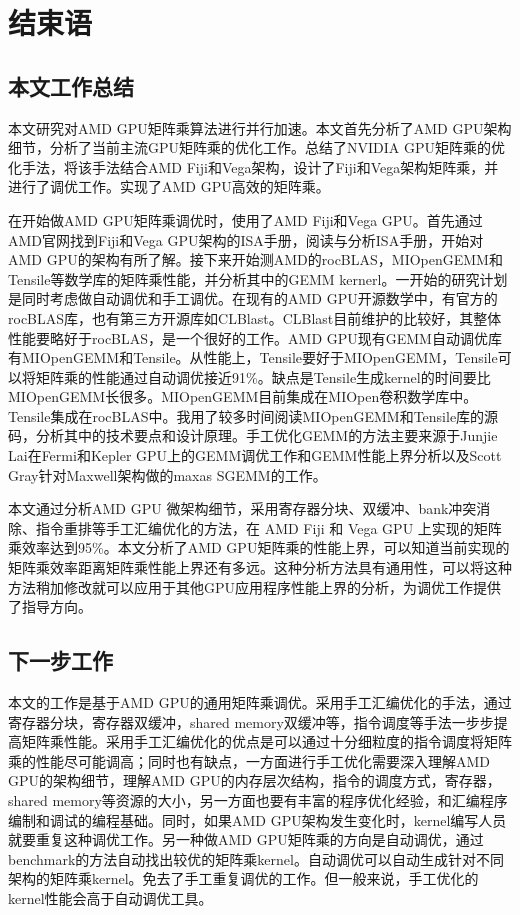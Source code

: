 \chapter{结束语}\label{chap:Conclusion}

\section{本文工作总结}
本文研究对AMD GPU矩阵乘算法进行并行加速。本文首先分析了AMD GPU架构细节，分析了当前主流GPU矩阵乘的优化工作。总结了NVIDIA GPU矩阵乘的优化手法，将该手法结合AMD Fiji和Vega架构，设计了Fiji和Vega架构矩阵乘，并进行了调优工作。实现了AMD GPU高效的矩阵乘。

在开始做AMD GPU矩阵乘调优时，使用了AMD Fiji和Vega GPU。首先通过AMD官网找到Fiji和Vega GPU架构的ISA手册，阅读与分析ISA手册，开始对AMD GPU的架构有所了解。接下来开始测AMD的rocBLAS，MIOpenGEMM和Tensile等数学库的矩阵乘性能，并分析其中的GEMM kernerl。一开始的研究计划是同时考虑做自动调优和手工调优。在现有的AMD GPU开源数学中，有官方的rocBLAS库，也有第三方开源库如CLBlast。CLBlast目前维护的比较好，其整体性能要略好于rocBLAS，是一个很好的工作。AMD GPU现有GEMM自动调优库有MIOpenGEMM和Tensile。从性能上，Tensile要好于MIOpenGEMM，Tensile可以将矩阵乘的性能通过自动调优接近91\%。缺点是Tensile生成kernel的时间要比MIOpenGEMM长很多。MIOpenGEMM目前集成在MIOpen卷积数学库中。Tensile集成在rocBLAS中。我用了较多时间阅读MIOpenGEMM和Tensile库的源码，分析其中的技术要点和设计原理。手工优化GEMM的方法主要来源于Junjie Lai在Fermi和Kepler GPU上的GEMM调优工作和GEMM性能上界分析以及Scott Gray针对Maxwell架构做的maxas SGEMM的工作。

本文通过分析AMD GPU 微架构细节，采用寄存器分块、双缓冲、bank冲突消除、指令重排等手工汇编优化的方法，在 AMD Fiji 和 Vega GPU 上实现的矩阵乘效率达到95\%。本文分析了AMD GPU矩阵乘的性能上界，可以知道当前实现的矩阵乘效率距离矩阵乘性能上界还有多远。这种分析方法具有通用性，可以将这种方法稍加修改就可以应用于其他GPU应用程序性能上界的分析，为调优工作提供了指导方向。

\section{下一步工作}
本文的工作是基于AMD GPU的通用矩阵乘调优。采用手工汇编优化的手法，通过寄存器分块，寄存器双缓冲，shared memory双缓冲等，指令调度等手法一步步提高矩阵乘性能。采用手工汇编优化的优点是可以通过十分细粒度的指令调度将矩阵乘的性能尽可能调高；同时也有缺点，一方面进行手工优化需要深入理解AMD GPU的架构细节，理解AMD GPU的内存层次结构，指令的调度方式，寄存器，shared memory等资源的大小，另一方面也要有丰富的程序优化经验，和汇编程序编制和调试的编程基础。同时，如果AMD GPU架构发生变化时，kernel编写人员就要重复这种调优工作。另一种做AMD GPU矩阵乘的方向是自动调优，通过benchmark的方法自动找出较优的矩阵乘kernel。自动调优可以自动生成针对不同架构的矩阵乘kernel。免去了手工重复调优的工作。但一般来说，手工优化的kernel性能会高于自动调优工具。


